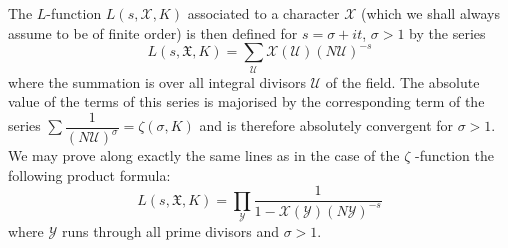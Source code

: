 The $L$-function $L (s ,\mathcal{X} , K)$ associated to a character
$\mathcal{X}$ (which we shall always assume to be of finite order) is
then defined for $s = \sigma + it$, $\sigma > 1$ by the series 
$$
L (s, \mathfrak{X}, K) = \sum_\mathscr{U} \mathcal{X} (\mathscr{U}) (N
\mathscr{U})^{-s} 
$$
where the summation is over all integral divisors $\mathscr{U}$ of the
field. The absolute value of the terms of this series is majorised by
the corresponding term of the series $\sum \dfrac{1}{(N
  \mathscr{U})^\sigma} = \zeta (\sigma, K)$ and is therefore
absolutely convergent for $\sigma > 1$. We may prove along exactly the
same lines as in the case of  the $\zeta$ -function the following
product formula:   
$$
L (s, \mathfrak{X}, K) = \prod_{\mathscr{Y}} \frac{1}{ 1- \mathcal{X}
  (\mathscr{Y}) (N \mathscr{Y})^{-s}} 
$$
where $\mathscr{Y}$ runs through all prime divisors and $\sigma > 1$.
